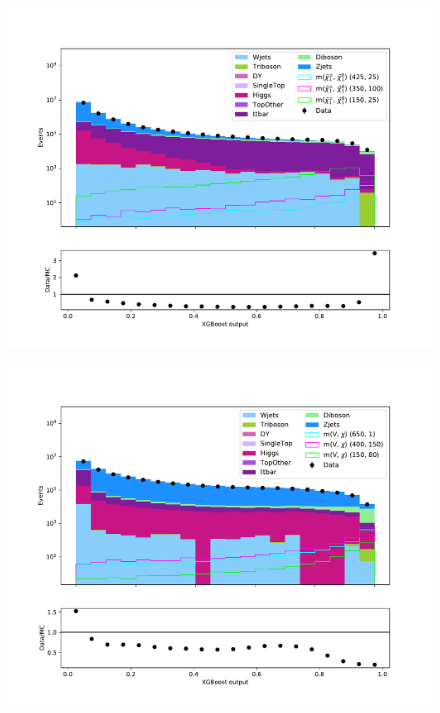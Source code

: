 \begin{figure}[H]
    \centering
        \includegraphics[width = \textwidth]{Figures/Stacked/stackedplot_BDT_High_level_WW.pdf}
        \caption{}
        \label{fig:traintestscaled}
\end{figure}





\begin{figure}[H]
    \centering
        \includegraphics[width = \textwidth]{Figures/Stacked/stackedplot_BDT_All_level_monoZ.pdf}
        \caption{}
        \label{fig:traintestscaled}
\end{figure}

